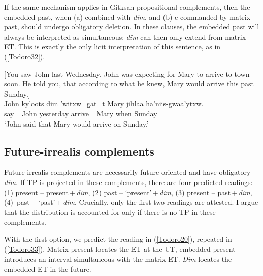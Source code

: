 \documentclass[output=paper]{langscibook}
\begin{document}
If the same mechanism applies in Gitksan propositional complements, then the embedded past, when (a) combined with \emph{dim}, and (b) c-commanded by matrix past, should undergo obligatory deletion. In these clauses, the embedded past will always be interpreted as simultaneous; \emph{dim} can then only extend from matrix ET. This is exactly the only licit interpretation of this sentence, as in (\ref{Todoro32}).  

\begin{exe}
\ex \label{Todoro32}
\begin{xlist}

\ex \label{Todoro32a} [You saw John last Wednesday. John was expecting for Mary to arrive to town soon. He told you, that according to what he knew, Mary would arrive this past Sunday.]\\
    {John} {ky'oots}  {dim} {'witxw=g̱at=t} {Mary} {jihlaa} {ha'niis-gwaa'ytxw}. \\
    say= John yesterday  arrive= Mary when Sunday\\
\glt ‘John said that Mary would arrive on Sunday.’ 

\ex \label{Todoro32b}

\end{xlist}
\end{exe}

\subsection{Future-irrealis complements}\label{Todoro:sect4.2}

Future-irrealis complements are necessarily future-oriented and have obligatory \emph{dim}. If %
TP is projected in these complements, there are four predicted readings: (1) present -- present\,+\,\emph{dim}, (2) past -- ‘present’\,+\,\emph{dim}, (3) present -- past\,+\,\emph{dim}, (4)~past -- ‘past’\,+\,\emph{dim}. Crucially, only the first two readings are attested. I argue that the distribution is accounted for only if there is no TP 
in these complements.

With the first option, we predict the reading in (\ref{Todoro20}), repeated in (\ref{Todoro33}). Matrix present locates the ET at the UT, embedded present introduces an interval simultaneous with the matrix ET. \emph{Dim} locates the embedded ET in the future.
\end{document}
